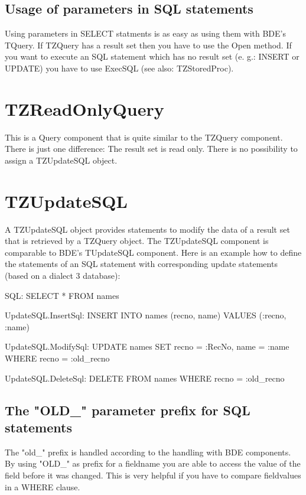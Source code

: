 \documentclass[a4paper,12pt,oneside]{book}
\begin{document}
\subsection{Usage of parameters in SQL statements}

Using parameters in SELECT statments is as easy as using them with BDE's TQuery.
If TZQuery has a result set then you have to use the Open method.
If you want to execute an SQL statement which has no result set (e. g.: INSERT or UPDATE) you have to use ExecSQL (see also: TZStoredProc).

\section{TZReadOnlyQuery}

This is a Query component that is quite similar to the TZQuery component.
There is just one difference:
The result set is read only.
There is no possibility to assign a TZUpdateSQL object.

\section{TZUpdateSQL}

A TZUpdateSQL object provides statements to modify the data of a result set that is retrieved by a TZQuery object.
The TZUpdateSQL component is comparable to BDE's TUpdateSQL component.
Here is an example how to define the statements of an SQL statement with corresponding update statements (based on a dialect 3 database):

SQL: SELECT * FROM names

UpdateSQL.InsertSql: INSERT INTO names (recno, name) VALUES (:recno, :name)

UpdateSQL.ModifySql: UPDATE names SET recno = :RecNo, name = :name WHERE recno = :old\_recno

UpdateSQL.DeleteSql: DELETE FROM names WHERE recno = :old\_recno

\subsection{The "OLD\_" parameter prefix for SQL statements}

The "old\_" prefix is handled according to the handling with BDE components.
By using "OLD\_" as prefix for a fieldname you are able to access the value of the field before it was changed.
This is very helpful if you have to compare fieldvalues in a WHERE clause.
\end{document}
